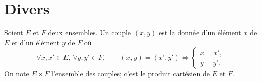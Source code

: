 \part{Divers}

\begin{defn}
	Soient $E$ et $F$ deux ensembles. Un \underline{couple} $(x,y)$ est la donnée d'un élément $x$ de $E$ et d'un élément $y$ de $F$ où \[
		\forall x,x' \in E,\,\forall y,y' \in F,\qquad (x,y) = (x',y') \iff \begin{cases}
			x=x',\\
			y=y'.
		\end{cases}
	\] On note $E \times F$ l'ensemble des couples; c'est le \underline{produit cartésien} de $E$ et $F$.
\end{defn}

